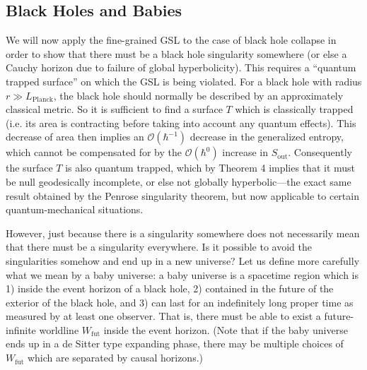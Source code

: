 \documentclass[12pt]{article}
\begin{document}
\subsection{Black Holes and Babies}\label{black}

We will now apply the fine-grained GSL to the case of black hole collapse in order to show that there must be a black hole singularity somewhere (or else a Cauchy horizon due to failure of global hyperbolicity).  This requires a ``quantum trapped surface'' on which the GSL is being violated.  For a black hole with radius $r \gg L_\mathrm{Planck}$, the black hole should normally be described by an approximately classical metric.  So it is sufficient to find a surface $T$ which is classically trapped (i.e. its area is contracting before taking into account any quantum effects).  This decrease of area then implies an $\mathcal{O}(\hbar^{-1})$ decrease in the generalized entropy, which cannot be compensated for by the $\mathcal{O}(\hbar^{0})$ increase in $S_\mathrm{out}$.  Consequently the surface $T$ is also quantum trapped, which by Theorem 4 implies that it must be null geodesically incomplete, or else not globally hyperbolic---the exact same result obtained by the Penrose singularity theorem, but now applicable to certain quantum-mechanical situations.

However, just because there is a singularity somewhere does not necessarily mean that there must be a singularity everywhere.  Is it possible to avoid the singularities somehow and end up in a new universe?  Let us define more carefully what we mean by a baby universe: a baby universe is a spacetime region which is 1) inside the event horizon of a black hole, 2) contained in the future of the exterior of the black hole, and 3) can last for an indefinitely long proper time as measured by at least one observer.  That is, there must be able to exist a future-infinite worldline $W_\mathrm{fut}$ inside the event horizon.  (Note that if the baby universe ends up in a de Sitter type expanding phase, there may be multiple choices of $W_\mathrm{fut}$ which are separated by causal horizons.)
\end{document}

